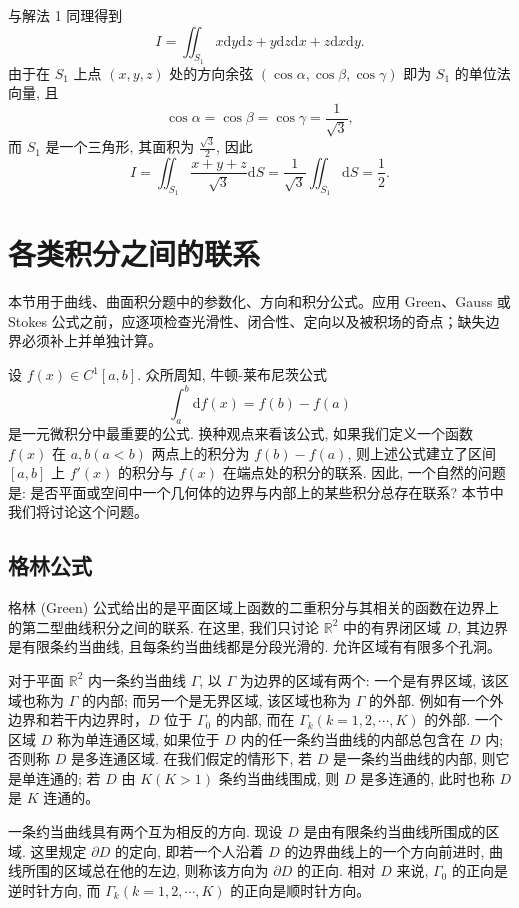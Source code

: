 \documentclass[12pt,fontset=fandol]{ctexart}
\begin{document}
\noindent{}\quad 与解法 1 同理得到
\[
  I=\iint_{S_1}x\mathrm dy\mathrm dz+y\mathrm dz\mathrm dx+z\mathrm dx\mathrm dy.
\]
由于在 $S_1$ 上点 $(x,y,z)$ 处的方向余弦 $(\cos\alpha,\cos\beta,\cos\gamma)$ 即为 $S_1$ 的单位法向量, 且
\[
  \cos\alpha=\cos\beta=\cos\gamma=\frac1{\sqrt3},
\]
而 $S_1$ 是一个三角形, 其面积为 $\frac{\sqrt3}{2}$, 因此
\[
  I=\iint_{S_1}\frac{x+y+z}{\sqrt3}\mathrm dS
  =\frac1{\sqrt3}\iint_{S_1}\mathrm dS=\frac12.
\]



\section{各类积分之间的联系}\label{course-16-5}
本节用于曲线、曲面积分题中的参数化、方向和积分公式。应用 Green、Gauss 或 Stokes 公式之前，应逐项检查光滑性、闭合性、定向以及被积场的奇点；缺失边界必须补上并单独计算。

设 $f(x)\in C^1[a,b]$. 众所周知, 牛顿-莱布尼茨公式
\[
  \int_a^b\mathrm df(x)=f(b)-f(a)
\]
是一元微积分中最重要的公式. 换种观点来看该公式, 如果我们定义一个函数 $f(x)$ 在 $a,b(a<b)$ 两点上的积分为 $f(b)-f(a)$, 则上述公式建立了区间 $[a,b]$ 上 $f'(x)$ 的积分与 $f(x)$ 在端点处的积分的联系. 因此, 一个自然的问题是: 是否平面或空间中一个几何体的边界与内部上的某些积分总存在联系? 本节中我们将讨论这个问题。

\subsection{格林公式}

格林 (Green) 公式给出的是平面区域上函数的二重积分与其相关的函数在边界上的第二型曲线积分之间的联系. 在这里, 我们只讨论 $\mathbb R^2$ 中的有界闭区域 $D$, 其边界是有限条约当曲线, 且每条约当曲线都是分段光滑的. 允许区域有有限多个孔洞。

对于平面 $\mathbb R^2$ 内一条约当曲线 $\Gamma$, 以 $\Gamma$ 为边界的区域有两个: 一个是有界区域, 该区域也称为 $\Gamma$ 的内部; 而另一个是无界区域, 该区域也称为 $\Gamma$ 的外部. 例如有一个外边界和若干内边界时，$D$ 位于 $\Gamma_0$ 的内部, 而在 $\Gamma_k(k=1,2,\cdots,K)$ 的外部. 一个区域 $D$ 称为单连通区域, 如果位于 $D$ 内的任一条约当曲线的内部总包含在 $D$ 内; 否则称 $D$ 是多连通区域. 在我们假定的情形下, 若 $D$ 是一条约当曲线的内部, 则它是单连通的; 若 $D$ 由 $K(K>1)$ 条约当曲线围成, 则 $D$ 是多连通的, 此时也称 $D$ 是 $K$ 连通的。

一条约当曲线具有两个互为相反的方向. 现设 $D$ 是由有限条约当曲线所围成的区域. 这里规定 $\partial D$ 的定向, 即若一个人沿着 $D$ 的边界曲线上的一个方向前进时, 曲线所围的区域总在他的左边, 则称该方向为 $\partial D$ 的正向. 相对 $D$ 来说, $\Gamma_0$ 的正向是逆时针方向, 而 $\Gamma_k(k=1,2,\cdots,K)$ 的正向是顺时针方向。
\end{document}
